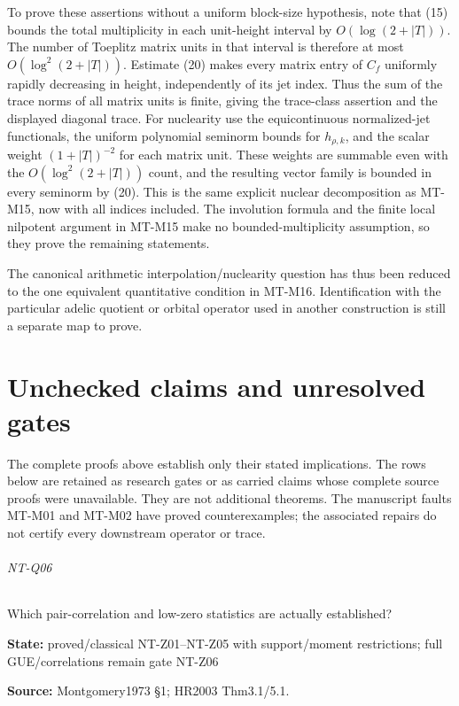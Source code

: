 \documentclass[11pt,a4paper]{article}
\begin{document}
To prove these assertions without a uniform block-size
hypothesis, note that (15) bounds the total multiplicity
in each unit-height interval by $O(\log(2+|T|))$.
The number of Toeplitz matrix units in that interval is
therefore at most $O(\log^2(2+|T|))$.
Estimate (20) makes every matrix entry of $C_f$ uniformly
rapidly decreasing in height, independently of its jet
index. Thus the sum of the trace norms of all matrix
units is finite, giving the trace-class assertion and
the displayed diagonal trace. For nuclearity use the
equicontinuous normalized-jet functionals, the uniform
polynomial seminorm bounds for $h_{\rho,k}$, and the
scalar weight $(1+|T|)^{-2}$ for each matrix unit.
These weights are summable even with the
$O(\log^2(2+|T|))$ count, and the resulting vector
family is bounded in every seminorm by (20).
This is the same explicit nuclear decomposition as
MT-M15, now with all indices included.
The involution formula and the finite local nilpotent
argument in MT-M15 make no bounded-multiplicity
assumption, so they prove the remaining statements.

The canonical arithmetic interpolation/nuclearity question
has thus been reduced to the one equivalent quantitative
condition in MT-M16. Identification with the particular
adelic quotient or orbital operator used in another
construction is still a separate map to prove.

\part{Unchecked claims and unresolved gates}
The complete proofs above establish only their stated implications.
The rows below are retained as research gates or as carried claims whose
complete source proofs were unavailable. They are not additional theorems.
The manuscript faults MT-M01 and MT-M02 have proved counterexamples;
the associated repairs do not certify every downstream operator or trace.

\paragraph{NT-Q06} Which pair-correlation and low-zero statistics are actually established?

\textbf{State:} proved/\allowbreak{}classical NT-Z01–\allowbreak{}NT-Z05 with support/\allowbreak{}moment restrictions; full GUE/\allowbreak{}correlations remain gate NT-Z06

\textbf{Source:} Montgomery1973 §1; HR2003 Thm3.\allowbreak{}1/\allowbreak{}5.\allowbreak{}1.
\end{document}
